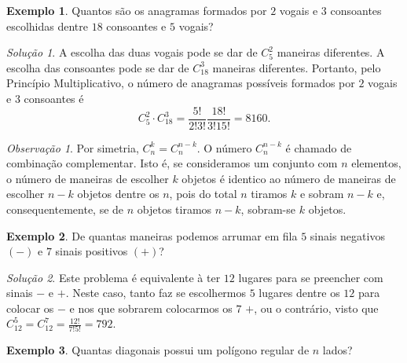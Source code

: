 \documentclass[]{book}
\theoremstyle{definition}
\theoremstyle{definition}
\newtheorem{example}{Exemplo}[chapter]
\theoremstyle{definition}
\theoremstyle{remark}
\newtheorem*{remark}{Observação}
\newtheorem*{solution}{Solução}
\begin{document}
\begin{example}
\protect\hypertarget{exm:unnamed-chunk-74}{}{\label{exm:unnamed-chunk-74} }Quantos são os anagramas formados por \(2\) vogais e \(3\) consoantes escolhidas dentre \(18\) consoantes e \(5\) vogais?
\end{example}

\begin{solution}
\iffalse{} {Solução. } \fi{}A escolha das duas vogais pode se dar de \(C^2_5\) maneiras diferentes.
A escolha das consoantes pode se dar de \(C^3_{18}\) maneiras diferentes.
Portanto, pelo Princípio Multiplicativo, o número de anagramas possíveis formados por \(2\) vogais e \(3\) consoantes é
\[C^2_5 \cdot C^3_{18} = \frac{5!}{2!3!}\frac{18!}{3!15!}=8160.\]
\end{solution}

\begin{remark}
\iffalse{} {Observação. } \fi{}Por simetria, \(C^{k}_{n} = C^{n-k}_n\).
O número \(C^{n-k}_n\) é chamado de combinação complementar.
Isto é, se consideramos um conjunto com \(n\) elementos, o número de maneiras de escolher \(k\) objetos é identico ao número de maneiras de escolher \(n-k\) objetos dentre os \(n\), pois do total \(n\) tiramos \(k\) e sobram \(n-k\) e, consequentemente, se de \(n\) objetos tiramos \(n-k\), sobram-se \(k\) objetos.
\end{remark}

\begin{example}
\protect\hypertarget{exm:unnamed-chunk-77}{}{\label{exm:unnamed-chunk-77} }De quantas maneiras podemos arrumar em fila \(5\) sinais negativos \((-)\) e \(7\) sinais positivos \((+)\)?
\end{example}

\begin{solution}
\iffalse{} {Solução. } \fi{}Este problema é equivalente à ter \(12\) lugares para se preencher com sinais \(-\) e \(+\).
Neste caso, tanto faz se escolhermos \(5\) lugares dentre os \(12\) para colocar os \(-\) e nos que sobrarem colocarmos os \(7\) \(+\), ou o contrário, visto que \(C^{5}_{12} = C^{7}_{12} = \frac{12!}{7!5!}=792.\)
\end{solution}

\begin{example}
\protect\hypertarget{exm:unnamed-chunk-79}{}{\label{exm:unnamed-chunk-79} }Quantas diagonais possui um polígono regular de \(n\) lados?
\end{example}
\end{document}
